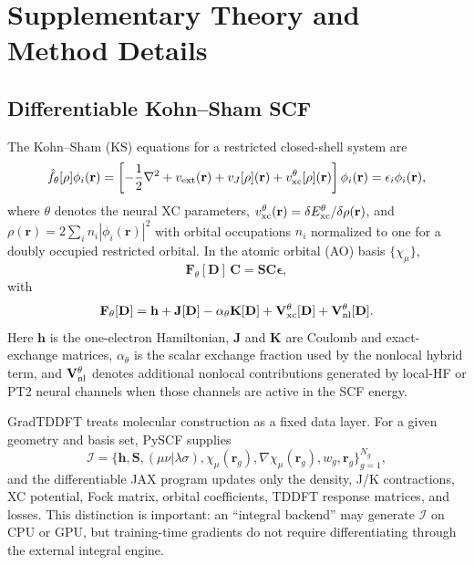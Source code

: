 \section{Supplementary Theory and Method Details}
\label{sec:si-theory-details}

\subsection{Differentiable Kohn--Sham SCF}
\label{sec:scf}

The Kohn--Sham (KS) equations for a restricted closed-shell system
are
\begin{equation}
  \hat{f}_\theta[\rho] \phi_i(\mathbf{r})
  =
  \left[-\frac{1}{2}\nabla^2 + v_{\rm ext}(\mathbf{r})
  + v_J[\rho](\mathbf{r}) + v_{\rm xc}^{\theta}[\rho](\mathbf{r})
  \right]\phi_i(\mathbf{r})
  = \epsilon_i \phi_i(\mathbf{r}),
  \label{eq:ks}
\end{equation}
where $\theta$ denotes the neural XC parameters,
$v_{\rm xc}^{\theta}(\mathbf{r}) = \delta E_{\rm xc}^{\theta}/
\delta\rho(\mathbf{r})$, and
$\rho(\mathbf{r}) = 2\sum_i n_i |\phi_i(\mathbf{r})|^2$ with
orbital occupations $n_i$ normalized to one for a doubly occupied
restricted orbital. In the atomic orbital (AO) basis
$\{\chi_\mu\}$,
\begin{equation}
  \mathbf{F}_\theta[\mathbf{D}]\,\mathbf{C}
  =
  \mathbf{S}\mathbf{C}\boldsymbol{\epsilon},
  \label{eq:generalized-eig}
\end{equation}
with
\begin{equation}
  \mathbf{F}_\theta[\mathbf{D}]
  = \mathbf{h} + \mathbf{J}[\mathbf{D}]
  - \alpha_\theta \mathbf{K}[\mathbf{D}]
  + \mathbf{V}_{\rm xc}^{\theta}[\mathbf{D}]
  + \mathbf{V}_{\rm nl}^{\theta}[\mathbf{D}].
  \label{eq:fock}
\end{equation}
Here $\mathbf{h}$ is the one-electron Hamiltonian, $\mathbf{J}$ and
$\mathbf{K}$ are Coulomb and exact-exchange matrices, $\alpha_\theta$
is the scalar exchange fraction used by the nonlocal hybrid term, and
$\mathbf{V}_{\rm nl}^{\theta}$ denotes additional nonlocal
contributions generated by local-HF or PT2 neural channels when those
channels are active in the SCF energy.

GradTDDFT treats molecular construction as a fixed data layer. For a
given geometry and basis set, PySCF supplies
\begin{equation}
  \mathcal{I} =
  \{\mathbf{h},\mathbf{S},(\mu\nu|\lambda\sigma),
  \chi_\mu(\mathbf{r}_g),\nabla\chi_\mu(\mathbf{r}_g),
  w_g,\mathbf{r}_g\}_{g=1}^{N_g},
  \label{eq:fixed-data}
\end{equation}
and the differentiable JAX program updates only the density,
J/K contractions, XC potential, Fock matrix, orbital coefficients,
TDDFT response matrices, and losses. This distinction is important:
an ``integral backend'' may generate $\mathcal{I}$ on CPU or GPU,
but training-time gradients do not require differentiating through
the external integral engine.

